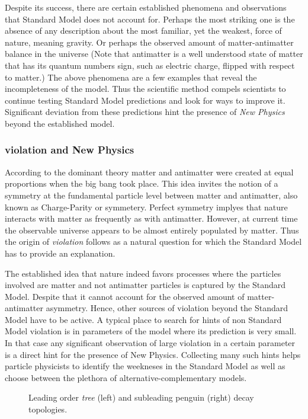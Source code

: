 Despite its success, there are certain established phenomena and observations that Standard
Model does not account for. Perhaps the most striking one is the absence of any description
about the most familiar, yet the weakest, force of nature, meaning gravity. Or perhaps the
observed amount of matter-antimatter balance in the universe \cite{more-cpv-huet,more-cpv-gavela_I,more-cpv-gavela_II}
(Note that antimatter is a well understood state of matter that has its quantum numbers sign,
such as electric charge, flipped with respect to matter.) The above phenomena are a few
examples that reveal the incompleteness of the model. Thus the scientific method compels
scientists to continue testing Standard Model predictions and look for ways to improve it.
Significant deviation from these predictions hint the presence of {\it New Physics}
beyond the established model.

\subsubsection{\CP violation and New Physics}
According to the dominant theory matter and antimatter were created at equal proportions
when the big bang took place. This idea invites the notion of a
symmetry at the fundamental particle level between matter and antimatter, also known as
Charge-Parity or \CP symmetery. Perfect \CP symmetry implyes that nature interacts with
matter as frequently as with antimatter. However, at current time the observable universe
appears to be almost entirely populated by matter. Thus the origin of {\it \CP  violation}
follows as a natural question for which the Standard Model has to provide an explanation.

The established idea that nature indeed favors processes where the particles involved
are matter and not antimatter particles is captured by the Standard Model.
Despite that it cannot account for the observed amount of matter-antimatter asymmetry.
Hence, other sources of \CP violation beyond the Standard Model have to be active.
A typical place to search for hints of non Standard Model \CP violation is in parameters
of the model where its prediction is very small. In that case any significant observation
of large \CP violation in a certain parameter is a direct hint for the presence of New Physics.
Collecting many such hints helps particle physicists to identify the weekneses in the
Standard Model as well as choose between the plethora of alternative-complementary models.


\begin{figure}[t]
  \begin{subfigure}{0.5\textwidth}
    \raggedright
    {\scalebox{1}{\sffamily }}
    \caption{}
    \label{app_jpsiphi_tree}
  \end{subfigure}%
  \hfill
  \begin{subfigure}{0.5\textwidth}
    \raggedleft
    {\scalebox{1}{\sffamily }}
    \caption{}
    \label{app_jpsiphi_peng}
  \end{subfigure}
    \caption{Leading order {\it tree} (left) and subleading penguin (right) \BsJpsiPhi decay topologies.}
  \label{app_jpsiphi_tree_peng}
\end{figure}



